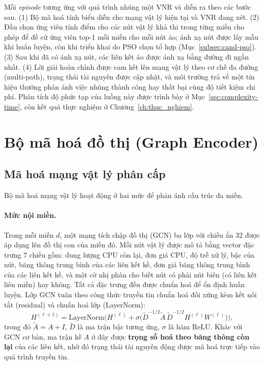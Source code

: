 \documentclass[../DoAn.tex]{subfiles}
\begin{document}
Mỗi \textit{episode} tương ứng với quá trình nhúng một VNR và diễn ra theo các bước sau. (1) Bộ mã hoá tính biểu diễn cho mạng vật lý hiện tại và VNR đang xét. (2) Đầu chọn ứng viên tính điểm cho các nút vật lý khả thi trong từng miền cho phép để đề cử ứng viên top-1 mỗi miền cho mỗi nút ảo; ánh xạ nút được lấy mẫu khi huấn luyện, còn khi triển khai do PSO chọn tổ hợp (Mục~\ref{subsec:cand-pso}). (3) Sau khi đã có ánh xạ nút, các liên kết ảo được ánh xạ bằng đường đi ngắn nhất. (4) Lời giải hoàn chỉnh được cam kết lên mạng vật lý theo cơ chế đa đường (multi-path), trạng thái tài nguyên được cập nhật, và môi trường trả về một tín hiệu thưởng phản ánh việc nhúng thành công hay thất bại cùng độ tiết kiệm chi phí. Phân tích độ phức tạp của luồng này được trình bày ở Mục~\ref{sec:complexity-time}, còn kết quả thực nghiệm ở Chương~\ref{ch:thuc_nghiem}.

\section{Bộ mã hoá đồ thị (Graph Encoder)}     %
\label{sec:encoder}

\subsection{Mã hoá mạng vật lý phân cấp}
\label{subsec:enc-substrate}

Bộ mã hoá mạng vật lý hoạt động ở hai mức để phản ánh cấu trúc đa miền.

\paragraph{Mức nội miền.} Trong mỗi miền $d$, một mạng tích chập đồ thị (GCN) ba lớp với chiều ẩn $32$ được áp dụng lên đồ thị con của miền đó. Mỗi nút vật lý được mô tả bằng vector đặc trưng $7$ chiều gồm: dung lượng CPU còn lại, đơn giá CPU, độ trễ xử lý, bậc của nút, băng thông trung bình của các liên kết kề, đơn giá băng thông trung bình của các liên kết kề, và một cờ nhị phân cho biết nút có phải nút biên (có liên kết liên miền) hay không. Tất cả đặc trưng đều được chuẩn hoá để ổn định huấn luyện. Lớp GCN tuân theo công thức truyền tin chuẩn hoá đối xứng kèm kết nối tắt (residual) và chuẩn hoá lớp (LayerNorm):
\begin{equation}
    H^{(\ell+1)} = \mathrm{LayerNorm}\!\Big( H^{(\ell)} + \sigma\big( \tilde{D}^{-1/2}\tilde{A}\,\tilde{D}^{-1/2} H^{(\ell)} W^{(\ell)} \big) \Big),
    \label{eq:gcn-layer}
\end{equation}
trong đó $\tilde{A}=A+I$, $\tilde{D}$ là ma trận bậc tương ứng, $\sigma$ là hàm ReLU. Khác với GCN cơ bản, ma trận kề $A$ ở đây được \textbf{trọng số hoá theo băng thông còn lại} của các liên kết, nhờ đó trạng thái tài nguyên động được mã hoá trực tiếp vào quá trình truyền tin.
\end{document}
